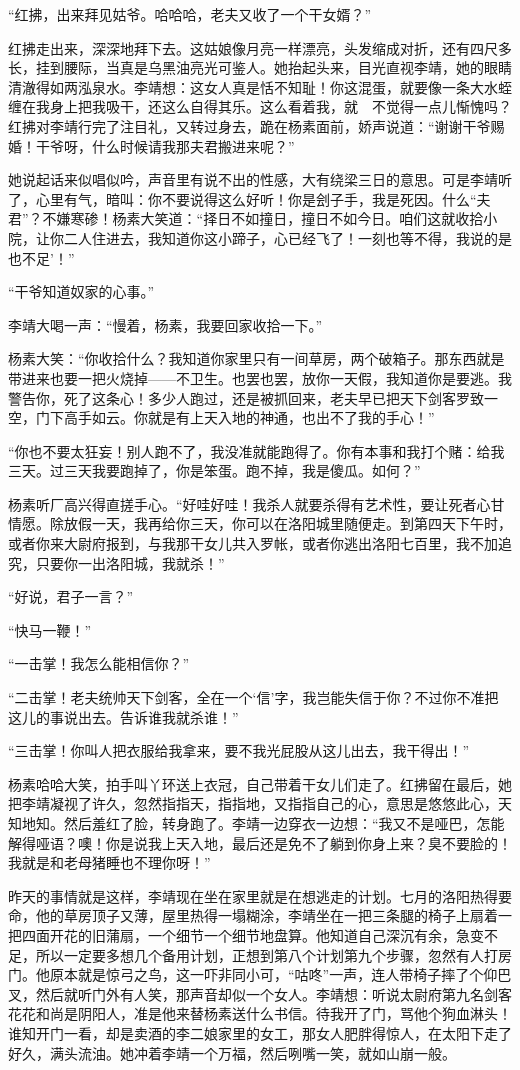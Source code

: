 “红拂，出来拜见姑爷。哈哈哈，老夫又收了一个干女婿？”

红拂走出来，深深地拜下去。这姑娘像月亮一样漂亮，头发缩成对折，还有四尺多长，挂到腰际，当真是乌黑油亮光可鉴人。她抬起头来，目光直视李靖，她的眼睛清澈得如两泓泉水。李靖想：这女人真是恬不知耻！你这混蛋，就要像一条大水蛭缠在我身上把我吸干，还这么自得其乐。这么看着我，就　不觉得一点儿惭愧吗？红拂对李靖行完了注目礼，又转过身去，跪在杨素面前，娇声说道：“谢谢干爷赐婚！干爷呀，什么时候请我那夫君搬进来呢？”

她说起话来似唱似吟，声音里有说不出的性感，大有绕梁三日的意思。可是李靖听了，心里有气，暗叫：你不要说得这么好听！你是刽子手，我是死因。什么“夫君”？不嫌寒碜！杨素大笑道：“择日不如撞日，撞日不如今日。咱们这就收拾小院，让你二人住进去，我知道你这小蹄子，心已经飞了！一刻也等不得，我说的是也不足’！”

“干爷知道奴家的心事。”

李靖大喝一声：“慢着，杨素，我要回家收拾一下。”

杨素大笑：“你收拾什么？我知道你家里只有一间草房，两个破箱子。那东西就是带进来也要一把火烧掉——不卫生。也罢也罢，放你一天假，我知道你是要逃。我警告你，死了这条心！多少人跑过，还是被抓回来，老夫早已把天下剑客罗致一空，门下高手如云。你就是有上天入地的神通，也出不了我的手心！”

“你也不要太狂妄！别人跑不了，我没准就能跑得了。你有本事和我打个赌：给我三天。过三天我要跑掉了，你是笨蛋。跑不掉，我是傻瓜。如何？”

杨素听厂高兴得直搓手心。“好哇好哇！我杀人就要杀得有艺术性，要让死者心甘情愿。除放假一天，我再给你三天，你可以在洛阳城里随便走。到第四天下午时，或者你来大尉府报到，与我那干女儿共入罗帐，或者你逃出洛阳七百里，我不加追究，只要你一出洛阳城，我就杀！”

“好说，君子一言？”

“快马一鞭！”

“一击掌！我怎么能相信你？”

“二击掌！老夫统帅天下剑客，全在一个‘信’字，我岂能失信于你？不过你不准把这儿的事说出去。告诉谁我就杀谁！”

“三击掌！你叫人把衣服给我拿来，要不我光屁股从这儿出去，我干得出！”

杨素哈哈大笑，拍手叫丫环送上衣冠，自己带着干女儿们走了。红拂留在最后，她把李靖凝视了许久，忽然指指天，指指地，又指指自己的心，意思是悠悠此心，天知地知。然后羞红了脸，转身跑了。李靖一边穿衣一边想：“我又不是哑巴，怎能解得哑语？噢！你是说我上天入地，最后还是免不了躺到你身上来？臭不要脸的！我就是和老母猪睡也不理你呀！”

昨天的事情就是这样，李靖现在坐在家里就是在想逃走的计划。七月的洛阳热得要命，他的草房顶子又薄，屋里热得一塌糊涂，李靖坐在一把三条腿的椅子上扇着一把四面开花的旧蒲扇，一个细节一个细节地盘算。他知道自己深沉有余，急变不足，所以一定要多想几个备用计划，正想到第八个计划第九个步骤，忽然有人打房门。他原本就是惊弓之鸟，这一吓非同小可，“咕咚”一声，连人带椅子摔了个仰巴叉，然后就听门外有人笑，那声音却似一个女人。李靖想：听说太尉府第九名剑客花花和尚是阴阳人，准是他来替杨素送什么书信。待我开了门，骂他个狗血淋头！谁知开门一看，却是卖酒的李二娘家里的女工，那女人肥胖得惊人，在太阳下走了好久，满头流油。她冲着李靖一个万福，然后咧嘴一笑，就如山崩一般。

